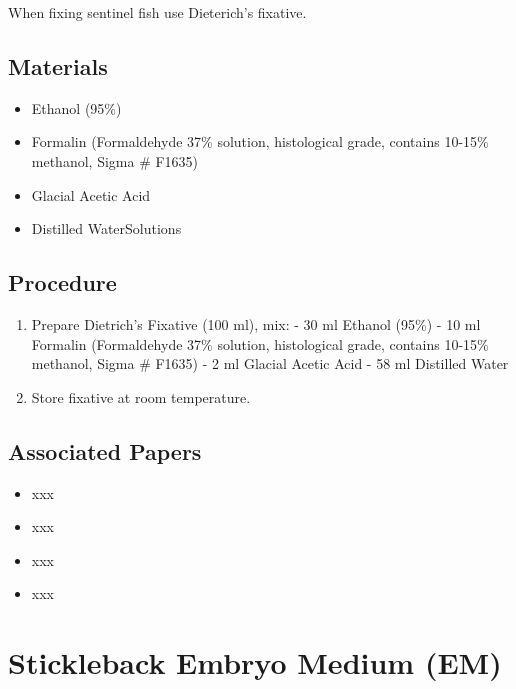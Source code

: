 \documentclass[
  letterpaper,
  DIV=11,
  numbers=noendperiod]{scrreprt}
\providecommand{\tightlist}{%
  \setlength{\itemsep}{0pt}\setlength{\parskip}{0pt}}\usepackage{longtable,booktabs,array}
\begin{document}
When fixing sentinel fish use Dieterich's fixative.

\hypertarget{materials-60}{%
\section{Materials}\label{materials-60}}

\begin{itemize}
\tightlist
\item
  Ethanol (95\%)
\item
  Formalin (Formaldehyde 37\% solution, histological grade, contains
  10-15\% methanol, Sigma \# F1635)
\item
  Glacial Acetic Acid
\item
  Distilled WaterSolutions
\end{itemize}

\hypertarget{procedure-61}{%
\section{Procedure}\label{procedure-61}}

\begin{enumerate}
\def\labelenumi{\arabic{enumi}.}
\tightlist
\item
  Prepare Dietrich's Fixative (100 ml), mix: - 30 ml Ethanol (95\%) - 10
  ml Formalin (Formaldehyde 37\% solution, histological grade, contains
  10-15\% methanol, Sigma \# F1635) - 2 ml Glacial Acetic Acid - 58 ml
  Distilled Water
\item
  Store fixative at room temperature.
\end{enumerate}

\hypertarget{associated-papers-41}{%
\section{Associated Papers}\label{associated-papers-41}}

\begin{itemize}
\tightlist
\item
  xxx
\item
  xxx
\item
  xxx
\item
  xxx
\end{itemize}

\hypertarget{sec-general_recipe_embryo_medium}{%
\chapter{Stickleback Embryo Medium
(EM)}\label{sec-general_recipe_embryo_medium}}
\end{document}
